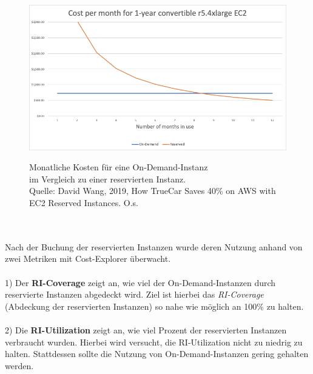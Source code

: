 \begin{figure}[h!]
  \centering
  \includegraphics[scale=0.6]{sources/Kosten_RIvsOn-Demand_pro_Monat_TrueCar}\label{fig:Kosten_RIvsOn-Demand_pro_Monat_TrueCar}\\
  \caption[Monatliche Kosten für eine On-Demand-Instanz im Vergleich zu einer reservierten Instanz]{}
\begin{footnotesize}
  \label{fig:Kosten_RIvsOn-Demand_pro_Monat_TrueCar}Monatliche Kosten für eine On-Demand-Instanz\\ im Vergleich zu einer reservierten Instanz.\\
  Quelle: David Wang, 2019, How TrueCar Saves 40\% on AWS with EC2 Reserved Instances. O.s.\cite{MED1}
\end{footnotesize}
\end{figure}
\\\\
Nach der Buchung der reservierten Instanzen wurde deren Nutzung anhand von zwei Metriken mit Cost-Explorer überwacht. 
\\\\
1) Der \textbf{RI-Coverage} zeigt an, wie viel der On-Demand-Instanzen durch reservierte Instanzen abgedeckt wird. Ziel ist hierbei das \textit{RI-Coverage} (Abdeckung der reservierten Instanzen) so nahe wie möglich an 100\% zu halten.
\\\\
2) Die \textbf{RI-Utilization} zeigt an, wie viel Prozent der reservierten Instanzen verbraucht wurden. Hierbei wird versucht, die RI-Utilization nicht zu niedrig zu halten. Stattdessen sollte die Nutzung von On-Demand-Instanzen gering gehalten werden. 
